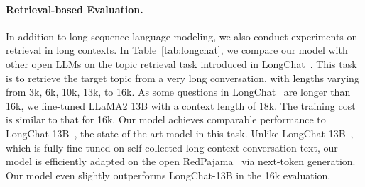 \documentclass{article} %
\begin{document}
\paragraph{Retrieval-based Evaluation.}
In addition to long-sequence language modeling, we also conduct experiments on retrieval in long contexts. In Table~\ref{tab:longchat}, we compare our model with other open LLMs on the topic retrieval task introduced in LongChat~\citep{longchat2023}. This task is to retrieve the target topic from a very long conversation, with lengths varying from 3k, 6k, 10k, 13k, to 16k. As some questions in LongChat~\citep{longchat2023} are longer than 16k, we fine-tuned LLaMA2 13B with a context length of 18k. The training cost is similar to that for 16k. Our model achieves comparable performance to LongChat-13B~\citep{longchat2023}, the state-of-the-art model in this task. Unlike LongChat-13B~\citep{longchat2023}, which is fully fine-tuned on self-collected long context conversation text, our model is efficiently adapted on the open RedPajama~\citep{together2023redpajama} via next-token generation. Our model even slightly outperforms LongChat-13B in the 16k evaluation.

\begin{table}[t]
\begin{center}
\caption{Ablation on fine-tuning steps in both full fine-tuning and low-rank training (with trainable normalization and embedding).
We fine-tune LLaMA2~\citep{llama2} 7B with the proposed Shift Short Attention. The target context length is 8192.
We use RedPajama~\citep{together2023redpajama} for training and  PG19~\citep{pg19} validation set for perplexity testing. Full fine-tuning has a faster convergence than the low-rank at the beginning, while the final gap is not large.}
\label{tab:num-steps}
\end{center}
\end{table}
\end{document}
